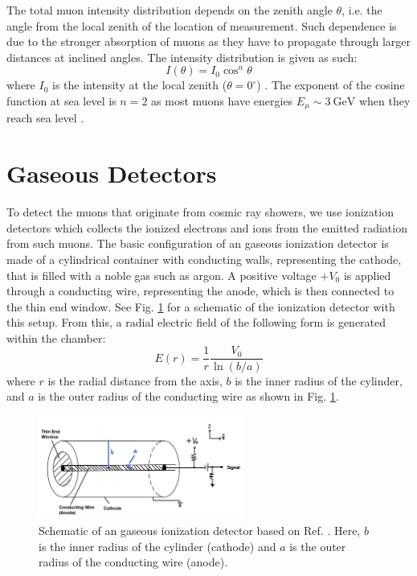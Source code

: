 \documentclass[a4paper]{report}
\numberwithin{equation}{section}
\begin{document}
The total muon intensity distribution depends on the zenith angle $\theta$, i.e. the angle from the local zenith of the location of 
measurement. Such dependence is due to the stronger absorption of muons as they have to propagate through larger distances at 
inclined angles. The intensity distribution is given as such: 
\begin{equation}
    I(\theta) = I_0 \cos^n \theta 
\end{equation}
where $I_0$ is the intensity at the local zenith ($\theta = 0^\circ$) \cite{Grupen2005}. The exponent of the cosine function at 
sea level is $n = 2$ as most muons have energies $E_\mu \sim \SI{3}{\giga\electronvolt}$ when they reach sea level \cite{Stefano2012}.

\section{Gaseous Detectors}

To detect the muons that originate from cosmic ray showers, we use ionization detectors which collects the ionized electrons and ions 
from the emitted radiation from such muons. The basic configuration of an gaseous ionization detector is 
made of a cylindrical container with conducting walls, representing the cathode, that is filled with a noble gas such as argon. A positive voltage 
$+V_0$ is applied through a conducting wire, representing the anode, which is then connected to the thin end window.
See Fig. \ref{fig:ionization_chamber_schematic} 
for a schematic of the ionization detector with this setup. From this, a radial electric field of the following form is generated within the chamber:
\begin{equation}
	E(r) = \frac{1}{r}\frac{V_0}{\ln (b / a)}
\end{equation}
where $r$ is the radial distance from the axis, $b$ is the inner radius of the cylinder, and $a$ is the outer radius of the conducting 
wire as shown in Fig. \ref{fig:ionization_chamber_schematic}. \par 

\begin{figure}[!h]
	\centering
	\includegraphics[width=0.6\textwidth]{ionization_chamber_schematic.png}
	\caption{Schematic of an gaseous ionization detector based on Ref. \cite{Leo1994}. Here, $b$ is the inner radius of the cylinder (cathode) and $a$ is the outer radius 
	of the conducting wire (anode).}
	\label{fig:ionization_chamber_schematic}	
\end{figure}
\end{document}
